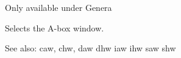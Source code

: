 
Only available under Genera

Selects the A-box window.

See also: caw, chw, daw dhw iaw ihw saw shw

